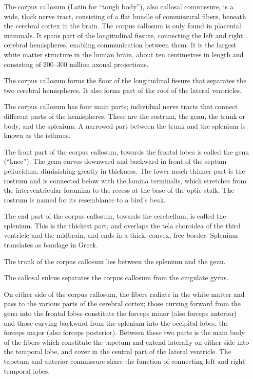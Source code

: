 The corpus callosum (Latin for ``tough body''), also callosal commissure, is a wide, thick nerve tract, consisting of a flat bundle of commissural fibers, beneath the cerebral cortex in the brain. The corpus callosum is only found in placental mammals. It spans part of the longitudinal fissure, connecting the left and right cerebral hemispheres, enabling communication between them. It is the largest white matter structure in the human brain, about ten centimetres in length and consisting of 200--300 million axonal projections.

The corpus callosum forms the floor of the longitudinal fissure that separates the two cerebral hemispheres. It also forms part of the roof of the lateral ventricles.

The corpus callosum has four main parts; individual nerve tracts that connect different parts of the hemispheres. These are the rostrum, the genu, the trunk or body, and the splenium. A narrowed part between the trunk and the splenium is known as the isthmus.

The front part of the corpus callosum, towards the frontal lobes is called the genu (``knee''). The genu curves downward and backward in front of the septum pellucidum, diminishing greatly in thickness. The lower much thinner part is the rostrum and is connected below with the lamina terminalis, which stretches from the interventricular foramina to the recess at the base of the optic stalk. The rostrum is named for its resemblance to a bird's beak.

The end part of the corpus callosum, towards the cerebellum, is called the splenium. This is the thickest part, and overlaps the tela choroidea of the third ventricle and the midbrain, and ends in a thick, convex, free border. Splenium translates as bandage in Greek.

The trunk of the corpus callosum lies between the splenium and the genu.

The callosal sulcus separates the corpus callosum from the cingulate gyrus.

On either side of the corpus callosum, the fibers radiate in the white matter and pass to the various parts of the cerebral cortex; those curving forward from the genu into the frontal lobes constitute the forceps minor (also forceps anterior) and those curving backward from the splenium into the occipital lobes, the forceps major (also forceps posterior). Between these two parts is the main body of the fibers which constitute the tapetum and extend laterally on either side into the temporal lobe, and cover in the central part of the lateral ventricle. The tapetum and anterior commissure share the function of connecting left and right temporal lobes.

